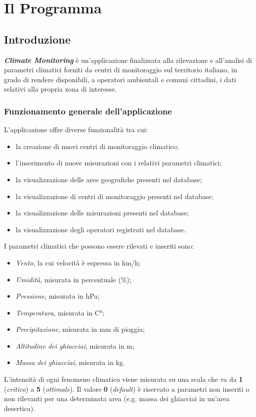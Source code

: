 \maketitle

\cleardoublepage
{}
{}
\tableofcontents

\listoffigures

\chapter{Il Programma}
\section{Introduzione}
\textsl{\textbf{Climate Monitoring}} \`e un'applicazione finalizzata alla rilevazione e all'analisi di parametri climatici forniti da centri di monitoraggio sul territorio italiano, in grado di rendere disponibili, a operatori ambientali e comuni cittadini, i dati relativi alla propria zona di interesse.
\subsection{Funzionamento generale dell'applicazione}
L'applicazione offre diverse funzionalit\`a tra cui:
\begin{itemize}
	\item la creazione di nuovi centri di monitoraggio climatico;
	\item l'inserimento di nuove misurazioni con i relativi parametri climatici;
	\item la visualizzazione delle aree geografiche presenti nel database;
	\item la visualizzazione di centri di monitoraggio presenti nel database;
	\item la visualizzazione delle misurazioni presenti nel database;
	\item la visualizzazione degli operatori registrati nel database.
\end{itemize}
\pagebreak
I parametri climatici che possono essere rilevati e inseriti sono:
\begin{itemize}
	\item \textsl{Vento}, la cui velocit\`a \`e espressa in km/h;
	\item \textsl{Umidit\`a}, misurata in percentuale (\%);
	\item \textsl{Pressione}, misurata in hPa;
	\item \textsl{Temperatura}, misurata in C°;
	\item \textsl{Precipitazione}, misurata in mm di pioggia;
	\item \textsl{Altitudine dei ghiacciai}, misurata in m;
	\item \textsl{Massa dei ghiacciai}, misurata in kg.
\end{itemize}
L'intensit\`a di ogni fenomeno climatico viene misurata su una scala che va da \textbf{1} (\textsl{critico}) a \textbf{5} (\textsl{ottimale}).
Il valore \textbf{0} (\textsl{default}) è riservato a parametri non inseriti o non rilevanti per una determinata area (e.g. massa dei ghiacciai in un'area desertica).

